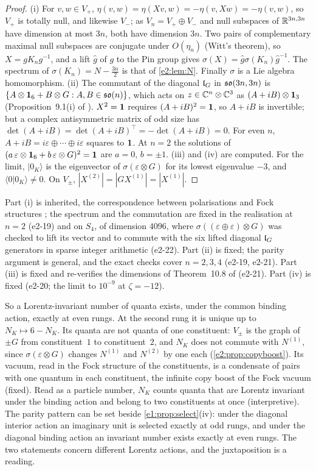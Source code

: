 \begin{proof}
(i) For $v,w\in V_+$, $\eta(v,w)=\eta(Xv,w)=-\eta(v,Xw)=-\eta(v,w)$, so $V_+$ is totally null, and likewise $V_-$; as $V_n=V_+\oplus V_-$ and
null subspaces of $\mathbb{R}^{3n,3n}$ have dimension at most $3n$, both have dimension $3n$. Two pairs of complementary maximal null subspaces are
conjugate under $O(\eta_n)$ (Witt's theorem), so $X=gK_ng^{-1}$, and a lift $\hat g$ of $g$ to the Pin group gives
$\sigma(X)=\hat g\sigma(K_n)\hat g^{-1}$. The spectrum of $\sigma(K_n)=N-\tfrac{3n}2$ is that of \cref{e2:lem:N}. Finally $\sigma$ is a Lie algebra
homomorphism. (ii) The commutant of the diagonal $\mathfrak l_G$ in $\mathfrak{so}(3n,3n)$ is $\{A\otimes\mathbf 1_6+B\otimes G:A,B\in\mathfrak{so}(n)\}$, which acts on $z\in\mathbb{C}^n\otimes\mathbb{C}^3$
as $(A+iB)\otimes\mathbf 1_3$ (Proposition~9.1(i) of \cite{RE}). $X^2=\mathbf 1$ requires $(A+iB)^2=\mathbf 1$, so $A+iB$ is invertible; but a complex antisymmetric
matrix of odd size has $\det(A+iB)=\det(A+iB)^{\!\top}=-\det(A+iB)=0$. For even $n$, $A+iB=i\varepsilon\oplus\cdots\oplus i\varepsilon$ squares to $\mathbf 1$. At
$n=2$ the solutions of $(a\,\varepsilon\otimes\mathbf 1_6+b\,\varepsilon\otimes G)^2=\mathbf 1$ are $a=0$, $b=\pm1$. (iii) and (iv) are computed. For the limit, $|0_K\rangle$ is the
eigenvector of $\sigma(\varepsilon\otimes G)$ for its lowest eigenvalue $-3$, and $\langle0|0_K\rangle\neq0$. On $V_\pm$, $|X^{(2)}|=|GX^{(1)}|=|X^{(1)}|$.
\end{proof}

Part (i) is inherited, the correspondence between polarisations and Fock structures \cite{Chevalley54,Berezin66}; the spectrum and the
commutation are fixed in the realisation at $n=2$ (e2-19) and on $S_4$, of dimension $4096$, where $\sigma((\varepsilon\oplus\varepsilon)\otimes G)$ was
checked to lift its vector and to commute with the six lifted diagonal $\mathfrak l_G$ generators in sparse integer arithmetic (e2-22). Part (ii) is
fixed; the parity argument is general, and the exact checks cover $n=2,3,4$ (e2-19, e2-21). Part (iii) is fixed and re-verifies the
dimensions of Theorem~10.8 of \cite{ES17} (e2-21). Part (iv) is fixed (e2-20; the limit to $10^{-9}$ at $\zeta=-12$).

So a Lorentz-invariant number of quanta exists, under the common binding action, exactly at even rungs. At the second rung it is unique up
to $N_K\mapsto6-N_K$. Its quanta are not quanta of one constituent: $V_\pm$ is the graph of $\pm G$ from constituent~$1$ to constituent~$2$, and
$N_K$ does not commute with $N^{(1)}$, since $\sigma(\varepsilon\otimes G)$ changes $N^{(1)}$ and $N^{(2)}$ by one each (\cref{e2:prop:copyboost}). Its
vacuum, read in the Fock structure of the constituents, is a condensate of pairs with one quantum in each constituent, the infinite
copy boost of the Fock vacuum (fixed). Read as a particle number, $N_K$ counts quanta that are Lorentz invariant under the binding action
and belong to two constituents at once (interpretive). The parity pattern can be set beside \cref{e1:prop:select}(iv): under the diagonal
interior action an imaginary unit is selected exactly at odd rungs, and under the diagonal binding action an invariant number exists
exactly at even rungs. The two statements concern different Lorentz actions, and the juxtaposition is a reading.


